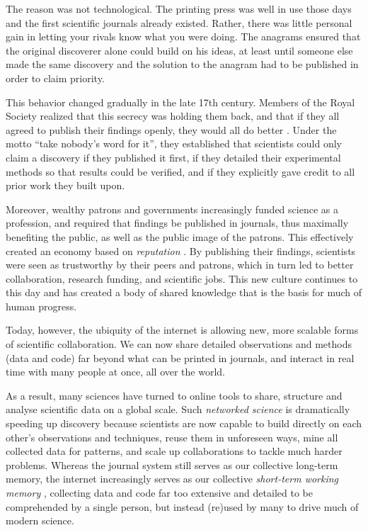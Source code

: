 \documentclass{acmproc-sp}
\begin{document}
The reason was not technological. The printing press was well in use those days and the first scientific journals already existed. Rather, there was little personal gain in letting your rivals know what you were doing. The anagrams ensured that the original discoverer alone could build on his ideas, at least until someone else made the same discovery and the solution to the anagram had to be published in order to claim priority.

This behavior changed gradually in the late 17th century. Members of the Royal Society realized that this secrecy was holding them back, and that if they all agreed to publish their findings openly, they would all do better \cite{kealey2010sex}. Under the motto ``take nobody's word for it'', they established that scientists could only claim a discovery if they published it first, if they detailed their experimental methods so that results could be verified, and if they explicitly gave credit to all prior work they built upon.

Moreover, wealthy patrons and governments increasingly funded science as a profession, and required that findings be published in journals, thus maximally benefiting the public, as well as the public image of the patrons. This effectively created an economy based on \textit{reputation} \cite{kealey2010sex,nielsen2008future}. By publishing their findings, scientists were seen as trustworthy by their peers and patrons, which in turn led to better collaboration, research funding, and scientific jobs. This new culture continues to this day and has created a body of shared knowledge that is the basis for much of human progress.

Today, however, the ubiquity of the internet is allowing new, more scalable forms of scientific collaboration. We can now share detailed observations and methods (data and code) far beyond what can be printed in journals, and interact in real time with many people at once, all over the world. 

As a result, many sciences have turned to online tools to share, structure and analyse scientific data on a global scale. Such \textit{networked science} is dramatically speeding up discovery because scientists are now capable to build directly on each other's observations and techniques, reuse them in unforeseen ways, mine all collected data for patterns, and scale up collaborations to tackle much harder problems. Whereas the journal system still serves as our collective long-term memory, the internet increasingly serves as our collective \textit{short-term working memory} \cite{nielsen2012reinventing}, collecting data and code far too extensive and detailed to be comprehended by a single person, but instead (re)used by many to drive much of modern science.
\end{document}
